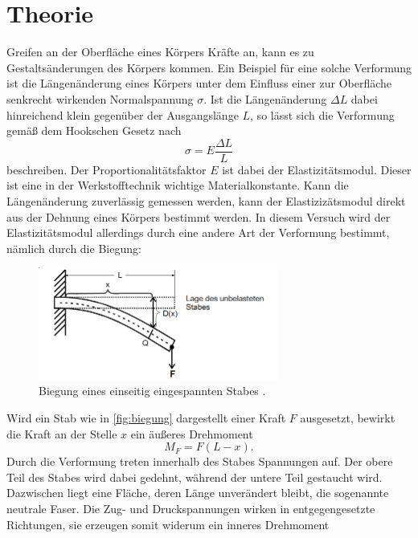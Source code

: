 \section{Theorie}
\label{sec:Theorie}

Greifen an der Oberfläche eines Körpers Kräfte an, kann es zu Gestaltsänderungen des Körpers kommen.
Ein Beispiel für eine solche Verformung ist die Längenänderung eines Körpers unter dem Einfluss einer
zur Oberfläche senkrecht wirkenden Normalspannung $\sigma$. Ist die Längenänderung $\Delta L$ dabei hinreichend klein
gegenüber der Ausgangslänge $L$, so lässt sich die Verformung gemäß dem Hookschen Gesetz nach
\begin{equation}
    \sigma = E \frac{\Delta L}{L}
    \label{eq:hooke}
\end{equation}
beschreiben. Der Proportionalitätsfaktor $E$ ist dabei der Elastizitätsmodul. Dieser ist eine in der Werkstofftechnik
wichtige Materialkonstante.
Kann die Längenänderung zuverlässig gemessen werden, kann der Elastizizätsmodul direkt aus der Dehnung eines Körpers bestimmt werden.
In diesem Versuch wird der Elastizitätsmodul allerdings durch eine andere Art der Verformung bestimmt, nämlich durch die Biegung:
\begin{figure}[H]
    \centering
    \includegraphics[width=0.7\textwidth]{assets/biegung.png}
    \caption{Biegung eines einseitig eingespannten Stabes \cite{V103}.}
    \label{fig:biegung}
\end{figure}
\noindent Wird ein Stab wie in \autoref{fig:biegung} dargestellt einer Kraft $F$ ausgesetzt, bewirkt die Kraft an der Stelle $x$ ein äußeres Drehmoment
\begin{equation}
    M_{F} = F (L-x) .
\end{equation}
Durch die Verformung treten innerhalb des Stabes Spannungen auf. Der obere Teil des Stabes wird dabei gedehnt, während der untere Teil gestaucht wird.
Dazwischen liegt eine Fläche, deren Länge unverändert bleibt, die sogenannte neutrale Faser. Die Zug- und Druckspannungen wirken in entgegengesetzte Richtungen,
sie erzeugen somit widerum ein inneres Drehmoment
